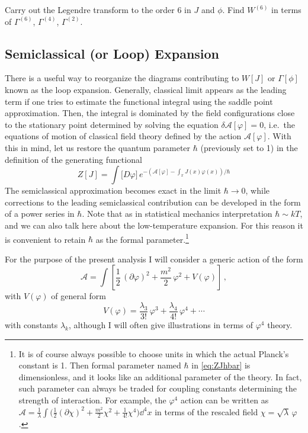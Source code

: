 \begin{exercise}
Carry out the Legendre transform to the order 6 in $J$ and $\phi$. Find
$W^{(6)}$ in terms of $\Gamma^{(6)}$, $\Gamma^{(4)}$, $\Gamma^{(2)}$.
\end{exercise}

\subsection*{Semiclassical (or Loop) Expansion}

There is a useful way to reorganize the diagrams contributing to $W[J]$ or
$\Gamma[\phi]$ known as the loop expansion. Generally, classical limit appears
as the leading term if one tries to estimate the functional integral using the
saddle point approximation. Then, the integral is dominated by the field
configurations close to the stationary point determined by solving the
equation $\delta\mathcal A[\varphi]=0$, i.e.\ the equations of motion of
classical field theory defined by the action $\mathcal A[\varphi]$. With this
in mind, let us restore the quantum parameter $\hbar$ (previously set to 1) in
the definition of the generating functional
\begin{equation}\label{eq:ZJhbar}
Z[J]=\int\bigl[D\varphi\bigr]\,e^{-(\mathcal A[\varphi]-\int_xJ(x)\varphi(x))/\hbar}
\end{equation}
The semiclassical approximation becomes exact in the limit $\hbar\to0$, while
corrections to the leading semiclassical contribution can be developed in the
form of a power series in $\hbar$. Note that as in statistical mechanics
interpretation $\hbar\sim kT$, and we can also talk here about the
low-temperature expansion. For this reason it is convenient to retain $\hbar$
as the formal parameter.\footnote{It is of course always possible to choose
units in which the actual Planck's constant is 1. Then formal parameter named
$\hbar$ in \eqref{eq:ZJhbar} is dimensionless, and it looks like an additional
parameter of the theory. In fact, such parameter can always be traded for
coupling constants determining the strength of interaction. For example, the
$\varphi^4$ action can be written as
$\mathcal A=\frac1\lambda\int\bigl(\frac12(\partial\chi)^2+\frac{m^2}2\chi^2+\frac1{4!}\chi^4\bigr)\dd^4x$
in terms of the rescaled field $\chi=\sqrt\lambda\,\varphi$.}

For the purpose of the present analysis I will consider a generic action of the
form
\begin{equation}\label{eq:genericA}
\mathcal A=\int\left[\frac12\,(\partial\varphi)^2+\frac{m^2}2\,\varphi^2+V(\varphi)\right]\,,
\end{equation}
with $V(\varphi)$ of general form
\[
V(\varphi)=\frac{\lambda_3}{3!}\,\varphi^3+\frac{\lambda_4}{4!}\,\varphi^4+\cdots
\]
with constants $\lambda_k$, although I will often give illustrations in terms
of $\varphi^4$ theory.


